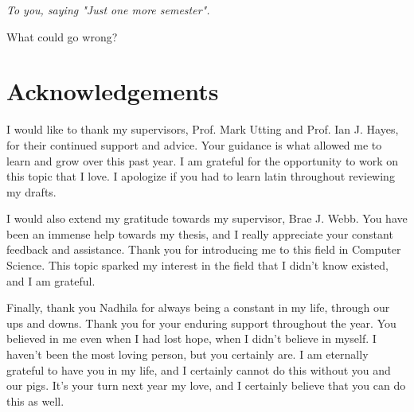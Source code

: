 \begin{center}
    \sl
    \hspace{0pt}
    \vfill
    To you, saying "Just one more semester".
    
    What could go wrong?
    \vfill
    \hspace{0pt}
\end{center}

\chapter*{Acknowledgements \label{sec:acknowledgements}}

I would like to thank my supervisors, Prof. Mark Utting and Prof. Ian J. Hayes, for their continued support and advice. Your guidance is 
what allowed me to learn and grow over this past year. I am grateful for the opportunity to work on this topic that I love. 
I apologize if you had to learn latin throughout reviewing my drafts.

I would also extend my gratitude towards my supervisor, Brae J. Webb. You have been an immense help towards my thesis, and I really appreciate your 
constant feedback and assistance. Thank you for introducing me to this field in Computer Science. This topic sparked my interest in 
the field that I didn't know existed, and I am grateful.

Finally, thank you Nadhila for always being a constant in my life, through our ups and downs. Thank you for your enduring support throughout 
the year. You believed in me even when I had lost hope, when I didn't believe in myself. I haven't been the most loving person, 
but you certainly are. I am eternally grateful to have you in my life, and I certainly cannot do this without you and our pigs. 
It's your turn next year my love, and I certainly believe that you can do this as well.